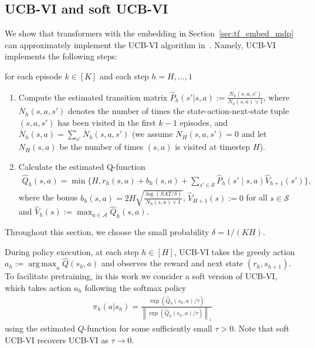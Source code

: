 \documentclass[10pt]{article}
\DeclareMathOperator*{\argmax}{arg\,max}
\newcommand{\norm}[1]{\left\|{#1}\right\|} %
\newcommand{\lone}[1]{\norm{#1}_1} %
\newcommand{\<}{\left\langle}
\renewcommand{\>}{\right\rangle}
\newcommand{\temp}{{\tau}}
\newcommand{\state}{{s}}
\newcommand{\action}{{a}}
\newcommand{\reward}{{r}}
\newcommand{\totlen}{{T}} %
\newcommand{\plc}{{\pi}}
\newcommand{\Numepi}{{K}}
\newcommand{\horizon}{{H}}
\newcommand{\statesp}{{\mathcal{S}}}
\newcommand{\actionsp}{{\mathcal{A}}}
\renewcommand{\horizon}{{H}}
\newcommand{\bonus}{{b}}
\newcommand{\tresttransit}{\widehat{P}}
\newcommand{\valuefun}{{V}}
\newcommand{\Numst}{{S}}
\newcommand{\Numact}{{A}}
\newcommand{\Numvi}{{N}}
\newcommand{\Qfun}{{Q}}
\newcommand{\trestQfun}{{\widehat{\Qfun}}} %
\newcommand{\Vfun}{{\valuefun}}
\newcommand{\trestVfun}{{\widehat{\Vfun}}}
\begin{document}
\subsection{UCB-VI and soft UCB-VI}\label{sec:example_ucbvi}
We show that transformers with the embedding in Section~\ref{sec:tf_embed_mdp}  can approximately implement the  UCB-VI algorithm in~\cite{azar2017minimax}. Namely, UCB-VI implements the following steps:

for each episode $k\in[\Numepi]$ and each step $h=\horizon,\ldots,1$
\begin{enumerate}
    \item Compute the estimated transition matrix $\tresttransit_h(\state'|\state,\action):=   \frac{\Numvi_h(\state,\action,\state')}{\Numvi_h(\state,\action)\vee 1}$,  where $\Numvi_h(\state,\action,\state')$ denotes the number of times the state-action-next-state tuple $(\state,\action,\state')$ has been visited in the first $k-1$ episodes, and $\Numvi_h(\state,\action)=\sum_{\state'}\Numvi_h(\state,\action,\state')$ (we assume $\Numvi_\horizon(\state,\action,\state')=0$ and let $\Numvi_\horizon(\state,\action)$  be the number of times $(\state,\action)$ is visited at timestep $\horizon$).
    \item Calculate the estimated Q-function \begin{align*}
\trestQfun_h(\state,\action)=\min\{\horizon,\reward_h(\state,\action)+\bonus_h(\state,\action)+\sum_{\state'\in\statesp}\tresttransit_h(\state'\mid\state,\action)\trestVfun_{h+1}(\state')\},\end{align*}
where the bonus $\bonus_h(\state,\action)=2\horizon\sqrt{\frac{\log(\Numst\Numact\totlen/\delta)}{\Numvi_h(\state,\action)\vee1}}$,  $\trestVfun_{\horizon+1}(\state):=0$ for all $\state\in\statesp$ and $\trestVfun_h(\state):=\max_{\action\in\actionsp}\trestQfun_h(\state,\action)$. 
\end{enumerate} Throughout this section, we choose the small probability $\delta=1/(\Numepi\horizon)$. 


During policy execution, at each step $h\in[\horizon]$, UCB-VI takes the greedy action $\action_h:=\argmax_{\action}\trestQfun(\state_h,\action)$ and observes the reward and next state $(\reward_h,\state_{h+1})$. To facilitate pretraining, in this work we consider a soft version of UCB-VI, which takes action $\action_h$  following the softmax policy 
\begin{align*}
\plc_h(\action|\state_h)=\frac{\exp(\trestQfun_h(\state_h,\action)/\temp)}{\lone{\exp(\trestQfun_h(\state_h,\action)/\temp)}}
\end{align*}
using the estimated $Q$-function for some sufficiently small $\temp>0$. Note that soft UCB-VI recovers UCB-VI as $\temp\to 0$.
\end{document}
